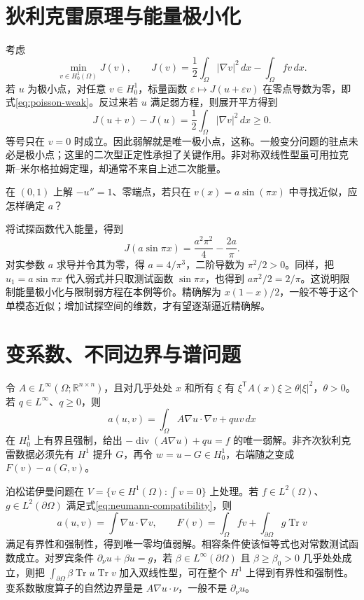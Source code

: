 \documentclass[UTF8,12pt,a4paper,fontset=fandol]{ctexbook}
\begin{document}
\section{狄利克雷原理与能量极小化}
考虑
\begin{equation}
 \min_{v\in H_0^1(\Omega)}J(v),\qquad
 J(v)=\frac12\int_\Omega|\nabla v|^2\,dx-\int_\Omega fv\,dx.
 \label{eq:dirichlet-functional}
\end{equation}
若 $u$ 为极小点，对任意 $v\in H_0^1$，标量函数 $\varepsilon\mapsto J(u+\varepsilon v)$ 在零点导数为零，即式\eqref{eq:poisson-weak}。反过来若 $u$ 满足弱方程，则展开平方得到
\[
 J(u+v)-J(u)=\frac12\int_\Omega|\nabla v|^2\,dx\ge0.
\]
等号只在 $v=0$ 时成立。因此弱解就是唯一极小点，这称。一般变分问题的驻点未必是极小点；这里的二次型正定性承担了关键作用。非对称双线性型虽可用拉克斯--米尔格拉姆定理，却通常不来自上述二次能量。

\begin{example}[只用一个试探函数作变分近似]
在 $(0,1)$ 上解 $-u''=1$、零端点，若只在 $v(x)=a\sin(\pi x)$ 中寻找近似，应怎样确定 $a$？
\end{example}
\begin{solve}
将试探函数代入能量，得到
\[
 J(a\sin\pi x)=\frac{a^2\pi^2}{4}-\frac{2a}{\pi}.
\]
对实参数 $a$ 求导并令其为零，得 $a=4/\pi^3$，二阶导数为 $\pi^2/2>0$。同样，把 $u_1=a\sin\pi x$ 代入弱式并只取测试函数 $\sin\pi x$，也得到 $a\pi^2/2=2/\pi$。这说明限制能量极小化与限制弱方程在本例等价。精确解为 $x(1-x)/2$，一般不等于这个单模态近似；增加试探空间的维数，才有望逐渐逼近精确解。
\end{solve}

\section{变系数、不同边界与谱问题}
令 $A\in L^\infty(\Omega;\mathbb R^{n\times n})$，且对几乎处处 $x$ 和所有 $\xi$ 有 $\xi^{\mathsf T}A(x)\xi\ge\theta|\xi|^2$，$\theta>0$。若 $q\in L^\infty$、$q\ge0$，则
\[
 a(u,v)=\int_\Omega A\nabla u\cdot\nabla v+quv\,dx
\]
在 $H_0^1$ 上有界且强制，给出 $-\operatorname{div}(A\nabla u)+qu=f$ 的唯一弱解。非齐次狄利克雷数据必须先有 $H^1$ 提升 $G$，再令 $w=u-G\in H_0^1$，右端随之变成 $F(v)-a(G,v)$。

泊松诺伊曼问题在 $V=\{v\in H^1(\Omega):\int v=0\}$ 上处理。若 $f\in L^2(\Omega)$、$g\in L^2(\partial\Omega)$ 满足式\eqref{eq:neumann-compatibility}，则
\[
 a(u,v)=\int\nabla u\cdot\nabla v,\qquad
 F(v)=\int_\Omega fv+\int_{\partial\Omega}g\operatorname{Tr}v
\]
满足有界性和强制性，得到唯一零均值弱解。相容条件使该恒等式也对常数测试函数成立。对罗宾条件 $\partial_\nu u+\beta u=g$，若 $\beta\in L^\infty(\partial\Omega)$ 且 $\beta\ge\beta_0>0$ 几乎处处成立，则把 $\int_{\partial\Omega}\beta\operatorname{Tr}u\operatorname{Tr}v$ 加入双线性型，可在整个 $H^1$ 上得到有界性和强制性。变系数散度算子的自然边界量是 $A\nabla u\cdot\nu$，一般不是 $\partial_\nu u$。
\end{document}
